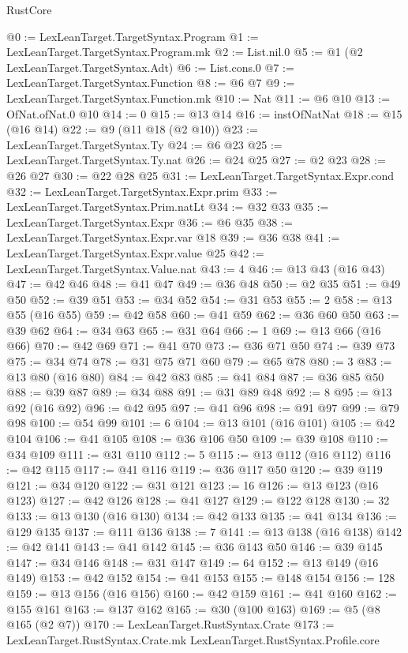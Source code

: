 \begin{lexlean}{RustCore}
\begin{coremodule}
@0 := LexLeanTarget.TargetSyntax.Program
@1 := LexLeanTarget.TargetSyntax.Program.mk
@2 := List.nil.{0}
@5 := @1 (@2 LexLeanTarget.TargetSyntax.Adt)
@6 := List.cons.{0}
@7 := LexLeanTarget.TargetSyntax.Function
@8 := @6 @7
@9 := LexLeanTarget.TargetSyntax.Function.mk
@10 := Nat
@11 := @6 @10
@13 := OfNat.ofNat.{0} @10
@14 := 0
@15 := @13 @14
@16 := instOfNatNat
@18 := @15 (@16 @14)
@22 := @9 (@11 @18 (@2 @10))
@23 := LexLeanTarget.TargetSyntax.Ty
@24 := @6 @23
@25 := LexLeanTarget.TargetSyntax.Ty.nat
@26 := @24 @25
@27 := @2 @23
@28 := @26 @27
@30 := @22 @28 @25
@31 := LexLeanTarget.TargetSyntax.Expr.cond
@32 := LexLeanTarget.TargetSyntax.Expr.prim
@33 := LexLeanTarget.TargetSyntax.Prim.natLt
@34 := @32 @33
@35 := LexLeanTarget.TargetSyntax.Expr
@36 := @6 @35
@38 := LexLeanTarget.TargetSyntax.Expr.var @18
@39 := @36 @38
@41 := LexLeanTarget.TargetSyntax.Expr.value @25
@42 := LexLeanTarget.TargetSyntax.Value.nat
@43 := 4
@46 := @13 @43 (@16 @43)
@47 := @42 @46
@48 := @41 @47
@49 := @36 @48
@50 := @2 @35
@51 := @49 @50
@52 := @39 @51
@53 := @34 @52
@54 := @31 @53
@55 := 2
@58 := @13 @55 (@16 @55)
@59 := @42 @58
@60 := @41 @59
@62 := @36 @60 @50
@63 := @39 @62
@64 := @34 @63
@65 := @31 @64
@66 := 1
@69 := @13 @66 (@16 @66)
@70 := @42 @69
@71 := @41 @70
@73 := @36 @71 @50
@74 := @39 @73
@75 := @34 @74
@78 := @31 @75 @71 @60
@79 := @65 @78
@80 := 3
@83 := @13 @80 (@16 @80)
@84 := @42 @83
@85 := @41 @84
@87 := @36 @85 @50
@88 := @39 @87
@89 := @34 @88
@91 := @31 @89 @48
@92 := 8
@95 := @13 @92 (@16 @92)
@96 := @42 @95
@97 := @41 @96
@98 := @91 @97
@99 := @79 @98
@100 := @54 @99
@101 := 6
@104 := @13 @101 (@16 @101)
@105 := @42 @104
@106 := @41 @105
@108 := @36 @106 @50
@109 := @39 @108
@110 := @34 @109
@111 := @31 @110
@112 := 5
@115 := @13 @112 (@16 @112)
@116 := @42 @115
@117 := @41 @116
@119 := @36 @117 @50
@120 := @39 @119
@121 := @34 @120
@122 := @31 @121
@123 := 16
@126 := @13 @123 (@16 @123)
@127 := @42 @126
@128 := @41 @127
@129 := @122 @128
@130 := 32
@133 := @13 @130 (@16 @130)
@134 := @42 @133
@135 := @41 @134
@136 := @129 @135
@137 := @111 @136
@138 := 7
@141 := @13 @138 (@16 @138)
@142 := @42 @141
@143 := @41 @142
@145 := @36 @143 @50
@146 := @39 @145
@147 := @34 @146
@148 := @31 @147
@149 := 64
@152 := @13 @149 (@16 @149)
@153 := @42 @152
@154 := @41 @153
@155 := @148 @154
@156 := 128
@159 := @13 @156 (@16 @156)
@160 := @42 @159
@161 := @41 @160
@162 := @155 @161
@163 := @137 @162
@165 := @30 (@100 @163)
@169 := @5 (@8 @165 (@2 @7))
@170 := LexLeanTarget.RustSyntax.Crate
@173 := LexLeanTarget.RustSyntax.Crate.mk LexLeanTarget.RustSyntax.Profile.core

\end{coremodule}
\end{lexlean}
